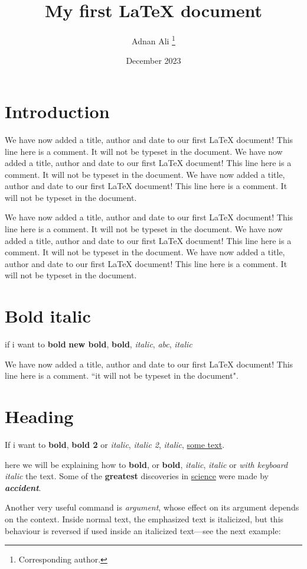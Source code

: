 \documentclass[12pt, a4paper]{article}
\title{My first LaTeX document}
\author{Adnan Ali \thanks{Corresponding author.}}
\date{December 2023}
\begin{document}
\maketitle
\section{Introduction}
We have now added a title, author and date to our first \LaTeX{} document!
This line here is a comment. It will not be typeset in the document.
We have now added a title, author and date to our first \LaTeX{} document!
This line here is a comment. It will not be typeset in the document.
We have now added a title, author and date to our first \LaTeX{} document!
This line here is a comment. It will not be typeset in the document.
\par
\noindent We have now added a title, author and date to our first \LaTeX{} document!
This line here is a comment. It will not be typeset in the document.
We have now added a title, author and date to our first \LaTeX{} document!
This line here is a comment. It will not be typeset in the document.
We have now added a title, author and date to our first \LaTeX{} document!
This line here is a comment. It will not be typeset in the document.

\section{Bold italic}
if i want to \textbf{bold} \textbf{new bold}, \textbf{bold}, \textit{italic}, \textit{abc}, \emph{italic}

We have now added a title, author and date to our first \LaTeX{} document!
This line here is a comment. ``it will not be typeset in the document".



\section{Heading}
If i want to \textbf{bold}, \textbf{bold 2} or \textit{italic}, \textit{italic 2}, \emph{italic}, \underline{some text}.  



here we will be explaining how to \textbf{bold}, or \textbf{bold}, \emph{italic}, \textit{italic} or \textit{with keyboard italic} the text. 
Some of the \textbf{greatest}
discoveries in \underline{science} 
were made by \textbf{\textit{accident}}.


Another very useful command is \emph{argument}, whose effect on its argument depends on the context. Inside normal text, the emphasized text is italicized, but this behaviour is reversed if used inside an italicized text—see the next example:
\end{document}
